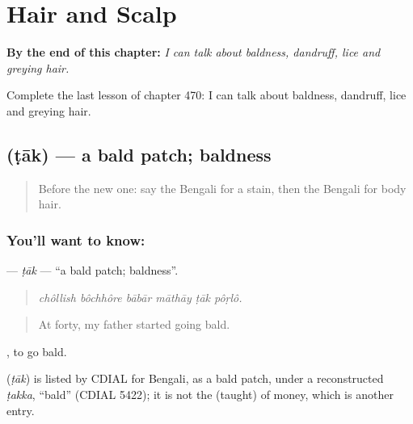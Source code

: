 
\chapter{Hair and Scalp}
\label{ch:bn-hair-and-scalp}

\begin{chapteropening}
\textbf{By the end of this chapter:} \emph{I can talk about baldness, dandruff, lice and greying hair.}

Complete the last lesson of chapter 470: I can talk about baldness, dandruff, lice and greying hair.
\end{chapteropening}

\section[\texorpdfstring{\bn{টাক} (ṭāk)}{টাক (ṭāk)}]{ (ṭāk) — a bald patch; baldness}

\label{lesson:BN-C470-tak}



\begin{quote}
Before the new one: say the Bengali for a stain, then the Bengali for body hair.
\end{quote}

\subsection*{You'll want to know: }
\textbf{} — \emph{ṭāk} — \textquotedblleft{}a bald patch; baldness\textquotedblright{}.

\begin{quote}
     
\end{quote}

\begin{quote}
\emph{chôllish bôchhôre bābār māthāy ṭāk pôṛlô.}
\end{quote}

\begin{quote}
At forty, my father started going bald.
\end{quote}

 , to go bald.

\begin{cousinweb}
\textbf{} (\emph{ṭāk}) is listed by CDIAL for Bengali, as a bald patch, under a reconstructed \emph{ṭakka}, \textquotedblleft{}bald\textquotedblright{} (CDIAL 5422); it is not the  (taught) of money, which is another entry.
\end{cousinweb}

